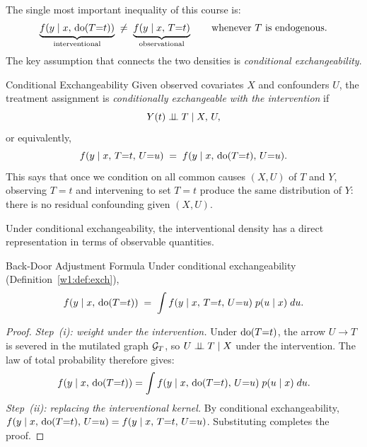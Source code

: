 \documentclass[master.tex]{subfiles}
\begin{document}
The single most important inequality of this course is:
\begin{equation}
  \underbrace{f\!\left(y \mid x,\, \mathrm{do}(T{=}t)\right)}_{\text{interventional}}
  \;\neq\;
  \underbrace{f\!\left(y \mid x,\, T{=}t\right)}_{\text{observational}}
  \qquad \text{whenever } T \text{ is endogenous.}
  \label{w1:eq:core}
\end{equation}
The key assumption that connects the two densities is \emph{conditional
exchangeability}.

\begin{defn}{Conditional Exchangeability}
\label{w1:def:exch}
Given observed covariates $X$ and confounders $U$, the treatment assignment
is \emph{conditionally exchangeable with the intervention} if
\[
  Y(t) \perp\!\!\!\perp T \mid X,\, U,
\]
or equivalently,
\[
  f(y \mid x,\, T{=}t,\, U{=}u) \;=\; f(y \mid x,\, \mathrm{do}(T{=}t),\, U{=}u).
\]
This says that once we condition on all common causes $(X, U)$ of $T$ and
$Y$, observing $T{=}t$ and intervening to set $T{=}t$ produce the same
distribution of $Y$: there is no residual confounding given $(X, U)$.
\end{defn}

Under conditional exchangeability, the interventional density has a direct
representation in terms of observable quantities.

\begin{prop}{Back-Door Adjustment Formula}
\label{w1:prop:backdoor}
Under conditional exchangeability (Definition~\ref{w1:def:exch}),
\begin{equation}
  f(y \mid x,\, \mathrm{do}(T{=}t))
  \;=\; \int f(y \mid x,\, T{=}t,\, U{=}u)\; p(u \mid x)\; du.
  \label{w1:eq:backdoor-formula}
\end{equation}
\end{prop}

\begin{proof}
\emph{Step~(i): weight under the intervention.}
Under $\mathrm{do}(T{=}t)$, the arrow $U \to T$ is severed in the mutilated
graph $\mathcal{G}_T$, so $U \perp\!\!\!\perp T \mid X$ under the intervention.
The law of total probability therefore gives:
\[
  f(y \mid x,\, \mathrm{do}(T{=}t))
  = \int f(y \mid x,\, \mathrm{do}(T{=}t),\, U{=}u)\; p(u \mid x)\; du.
\]
\emph{Step~(ii): replacing the interventional kernel.}
By conditional exchangeability,
$f(y \mid x,\, \mathrm{do}(T{=}t),\, U{=}u) = f(y \mid x,\, T{=}t,\, U{=}u)$.
Substituting completes the proof.
\end{proof}
\end{document}
